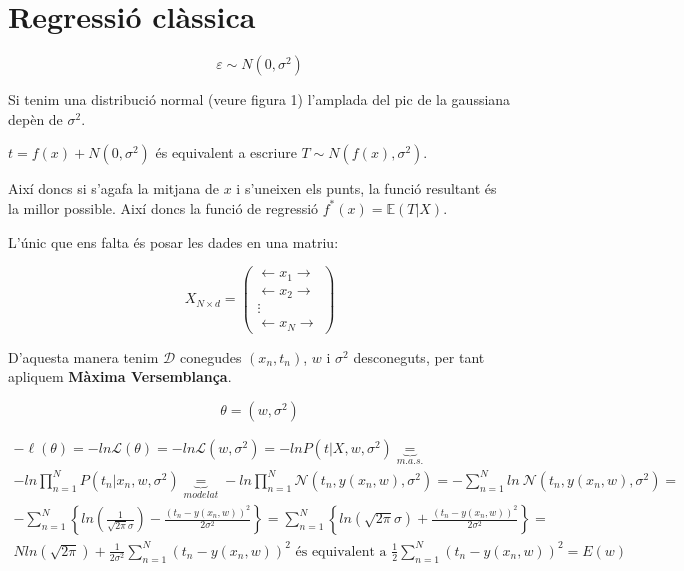 \section{Regressió clàssica}

$$
\varepsilon \sim N(0, \sigma^2)
$$

Si tenim una distribució normal (veure figura 1) l'amplada del pic de la gaussiana depèn de $\sigma^2$.

\begin{figure}[H]
    \centering
\end{figure}

$ t = f(x) + N(0, \sigma^2) $ és equivalent a escriure $T \sim N(f(x), \sigma^2) $.

Així doncs si s'agafa la mitjana de $x$ i s'uneixen els punts, la funció resultant és la millor possible. Així doncs la funció de regressió $f^*(x) = \mathbb{E}(T|X)$.

L'únic que ens falta és posar les dades en una matriu:

$$
X_{N \times d} =
\begin{pmatrix}
\longleftarrow x_1 \longrightarrow \\
\longleftarrow x_2 \longrightarrow \\
\vdots \\
\longleftarrow x_N \longrightarrow
\end{pmatrix}
$$

D'aquesta manera tenim $\mathcal{D}$ conegudes $(x_n, t_n)$, $w$ i $\sigma^2$ desconeguts, per tant apliquem \textbf{Màxima Versemblança}.

$$
\theta = (w, \sigma^2)
$$

\begin{gather*}
-\ell (\theta) = -ln \mathcal{L} (\theta) = 
-ln \mathcal{L}(w, \sigma^2) =
-ln P(t | X, w, \sigma^2) \underbrace{=}_{m.a.s.} \\
-ln \prod_{n=1}^N P(t_n | x_n, w, \sigma^2) \underbrace{=}_{modelat}
-ln \prod_{n=1}^N \mathcal{N} (t_n, y(x_n, w), \sigma^2) =
- \sum_{n=1}^N ln \ \mathcal{N} (t_n, y(x_n, w), \sigma^2) = \\
- \sum_{n=1}^N \left\{ ln \left( \frac{1}{\sqrt{2\pi}\sigma} \right) - \frac{(t_n - y(x_n, w))^2}{2\sigma^2} \right\} = 
\sum_{n=1}^N \left\{ ln(\sqrt{2\pi}\sigma) + \frac{(t_n - y(x_n, w))^2}{2\sigma^2} \right\} = \\
N ln (\sqrt{2\pi}) + \frac{1}{2\sigma^2} \sum_{n=1}^N (t_n - y(x_n,w))^2 \text{ és equivalent a } \frac{1}{2} \sum_{n=1}^N (t_n - y(x_n, w))^2 = E(w)
\end{gather*}

